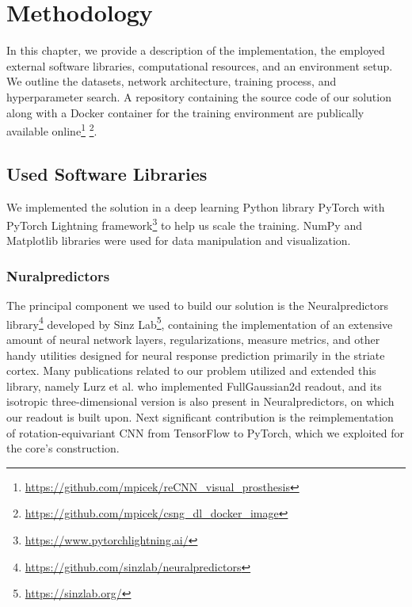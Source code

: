 \chapter{Methodology}\label{methodology}

In this chapter, we provide a description of the implementation, the employed external software libraries, computational resources, and an environment setup. We outline the datasets, network architecture, training process, and hyperparameter search. A repository containing the source code of our solution along with a Docker container for the training environment are publically available online\footnote{\url{https://github.com/mpicek/reCNN_visual_prosthesis}} \footnote{\url{https://github.com/mpicek/csng_dl_docker_image}}.

\section{Used Software Libraries}

We implemented the solution in a deep learning Python library PyTorch \citep{paszke2019pytorch} with PyTorch Lightning framework\footnote{\url{https://www.pytorchlightning.ai/}} to help us scale the training. NumPy \citep{van2011numpy} and Matplotlib \citep{hunter2007matplotlib} libraries were used for data manipulation and visualization.

\subsection{Nuralpredictors}

The principal component we used to build our solution is the Neuralpredictors library\footnote{\url{https://github.com/sinzlab/neuralpredictors}} developed by Sinz Lab\footnote{\url{https://sinzlab.org/}}, containing the implementation of an extensive amount of neural network layers, regularizations, measure metrics, and other handy utilities designed for neural response prediction primarily in the striate cortex. Many publications related to our problem utilized and extended this library, namely Lurz et al.\citep{lurz2021generalization} who implemented FullGaussian2d readout, and its isotropic three-dimensional version is also present in Neuralpredictors, on which our readout is built upon. Next significant contribution is the reimplementation of rotation-equivariant CNN \citep{ecker2018rotation} from TensorFlow \citep{tensorflow2015-whitepaper} to PyTorch, which we exploited for the core’s construction.

